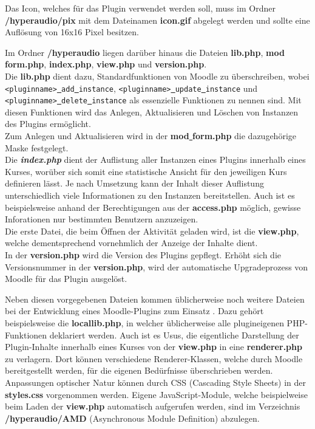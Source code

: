 Das Icon, welches für das Plugin  verwendet werden soll, muss im Ordner \textbf{/hyperaudio/pix} mit dem Dateinamen \textbf{icon.gif} abgelegt werden und sollte eine Auflösung von 16x16 Pixel besitzen.

Im Ordner \textbf{/hyperaudio} liegen darüber hinaus die Dateien \textbf{lib.php}, \textbf{mod\underline{{ }}form.php}, \textbf{index.php}, \textbf{view.php} und \textbf{version.php}.\\
Die \textbf{lib.php} dient dazu, Standardfunktionen von Moodle zu überschreiben, wobei \texttt{<pluginname>\underline{{ }}add\underline{{ }}instance}, \texttt{<pluginname>\underline{{ }}update\underline{{ }}instance} und \texttt{<pluginname>\underline{{ }}delete\underline{{ }}instance} als essenzielle Funktionen zu nennen sind. Mit diesen Funktionen wird das Anlegen, Aktualisieren und Löschen von Instanzen des Plugins ermöglicht.\\
Zum Anlegen und Aktualisieren wird in der \textbf{mod\underline{{ }}form.php} die dazugehörige Maske festgelegt.\\
Die \textbf{\textit{index.php}} dient der Auflistung aller Instanzen eines Plugins innerhalb eines Kurses, worüber sich somit eine statistische Ansicht für den jeweiligen Kurs definieren lässt. Je nach Umsetzung kann der Inhalt dieser Auflistung unterschiedlich viele Informationen zu den Instanzen bereitstellen. Auch ist es beispielsweise anhand der Berechtigungen aus der \textbf{access.php} möglich, gewisse Inforationen nur bestimmten Benutzern anzuzeigen.\\
Die erste Datei, die beim Öffnen der Aktivität geladen wird, ist die \textbf{view.php}, welche dementsprechend vornehmlich der Anzeige der Inhalte dient.\\
In der \textbf{version.php} wird die Version des Plugins gepflegt. Erhöht sich die Versionsnummer in der \textbf{version.php}, wird der automatische Upgradeprozess von Moodle für das Plugin ausgelöst.

Neben diesen vorgegebenen Dateien kommen üblicherweise noch weitere Dateien bei der Entwicklung eines Moodle-Plugins zum Einsatz \citep{wild2017moodle}. Dazu gehört beispielsweise die \textbf{locallib.php}, in welcher üblicherweise alle plugineigenen PHP-Funktionen deklariert werden. Auch ist es Usus, die eigentliche Darstellung der Plugin-Inhalte innerhalb eines Kurses von der \textbf{view.php} in eine \textbf{renderer.php} zu verlagern. Dort können verschiedene Renderer-Klassen, welche durch Moodle bereitgestellt werden, für die eigenen Bedürfnisse überschrieben werden. Anpassungen optischer Natur können durch CSS (Cascading Style Sheets) in der \textbf{styles.css} vorgenommen werden. Eigene JavaScript-Module, welche beispielweise beim Laden der \textbf{view.php} automatisch aufgerufen werden, sind im Verzeichnis \textbf{/hyperaudio/AMD} (Asynchronous Module Definition) abzulegen.

